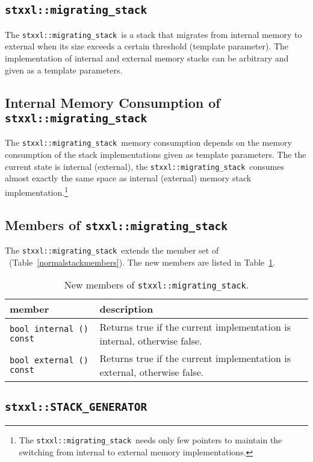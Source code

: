 \documentclass[twoside]{book}
\begin{document}
\newcommand{\xmstack}{\texttt{stxxl::migrating\_stack}}
\subsection{\xmstack}
The \xmstack\ is a stack that migrates from internal memory to
external when its size exceeds a certain threshold (template
parameter). The implementation
of internal and external memory stacks can be arbitrary and given as a
template parameters.


\subsection*{Internal Memory Consumption of \xmstack}
The \xmstack\ memory consumption depends on the memory consumption of
the stack implementations given as template parameters. The the
current state is internal (external), the \xmstack\ consumes almost
exactly the same space as internal (external) memory stack
implementation.\footnote{The \xmstack\ needs only few pointers to
maintain the switching from internal to external memory
implementations.}  

\subsection*{Members of \xmstack}
The \xmstack\ extends the member set of \xnormalstack\
(Table~\ref{normalstackmembers}). The new members are listed in
Table~\ref{migratingstackmembers}. 
\begin{table}[h]
\begin{center}
\caption{New members of \xmstack.}
\label{migratingstackmembers}
\begin{tabular}{|p{6cm}|p{5cm}|}
\hline
member & description  \\
\hline\hline
\texttt{bool    internal () const} & Returns true if the current
implementation is internal, otherwise false. \\ 
\hline
\texttt{bool    external () const} & Returns true if the current
implementation is external, otherwise false. \\
\hline
\end{tabular}
\end{center}
\end{table}

\newcommand{\xstackg}{\texttt{stxxl::STACK\_GENERATOR}}

\subsection{\xstackg}
\label{stackgensection}
\end{document}
